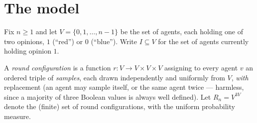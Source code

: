 
\begin{abstract}
\noindent
We give a complete, elementary proof that the \emph{3-majority}
opinion-dynamics process on $n$ fully-mixing agents, each holding one of two
opinions, reaches consensus within $O(\log n)$ rounds with probability
$1-O(1/n)$, provided the initial imbalance between the two opinions exceeds
a fixed constant fraction of $n$ (at least $60\%$ vs.\ $40\%$). The
probability space is finite and uniform throughout; the only analytic
ingredient beyond finite sums is a single self-contained exponential-moment
(Chernoff-type) concentration lemma for sums of independent
$\{0,1\}$-valued random variables, proved from the elementary bound
$1+x \le e^x$ --- no measure theory, no PMF/kernels, no appeal to Mathlib's
probability library. This is a genuinely different regime from the
companion \texttt{rumor\_spread} (push protocol) development: the
opinion-$1$ count is \emph{not} monotone in the round index (an unlucky
round can shrink it), so a counting argument over ``good rounds'' does not
suffice --- honest concentration around the process's mean trajectory is
needed in \emph{both} the growth and saturation phases. This argument has
been \emph{fully formalized} (no \texttt{sorry}) in Lean~4 + Mathlib; the
main theorem is \texttt{ThreeMajority.majority3\_consensus\_whp}.
\end{abstract}

\section{The model}\label{sec:model}

Fix $n \ge 1$ and let $V = \{0,1,\dots,n-1\}$ be the set of agents, each
holding one of two opinions, $1$ (``red'') or $0$ (``blue''). Write
$I \subseteq V$ for the set of agents currently holding opinion $1$.

\begin{definition}\label{def:round}
  \leanok
  A \emph{round configuration} is a function $r \colon V \to V \times V
  \times V$ assigning to every agent $v$ an ordered triple of \emph{samples},
  each drawn independently and uniformly from $V$, \emph{with} replacement
  (an agent may sample itself, or the same agent twice --- harmless, since a
  majority of three Boolean values is always well defined). Let
  $R_n = V^{3V}$ denote the (finite) set of round configurations, with the
  uniform probability measure.
\end{definition}

